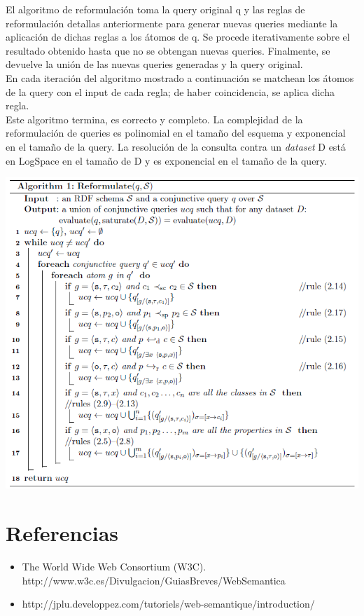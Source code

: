 \documentclass[10pt,a4paper]{article}
\begin{document}
El algoritmo de reformulación toma la query original q y las reglas de reformulación detallas anteriormente para generar nuevas queries mediante la aplicación de dichas reglas a los átomos de q. Se procede iterativamente sobre el resultado obtenido hasta que no se obtengan nuevas queries. Finalmente, se devuelve la unión de las nuevas queries generadas y la query original.\\

En cada iteración del algoritmo mostrado a continuación se matchean los átomos de la query con el input de cada regla; de haber coincidencia, se aplica dicha regla.\\

Este algoritmo termina, es correcto y completo. La complejidad de la reformulación de queries es polinomial en el tamaño del esquema y exponencial en el tamaño de la query. La resolución de la consulta contra un \textit{dataset} D está en LogSpace en el tamaño de D y es exponencial en el tamaño de la query.\\

\vspace{100 mm}

\begin{center}
\includegraphics[scale=0.55]{imgs/06.png}
\end{center}

\section{Referencias}

\begin{itemize}
\item The World Wide Web Consortium (W3C). http://www.w3c.es/Divulgacion/GuiasBreves/WebSemantica
\item http://jplu.developpez.com/tutoriels/web-semantique/introduction/
\end{itemize}
\end{document}
